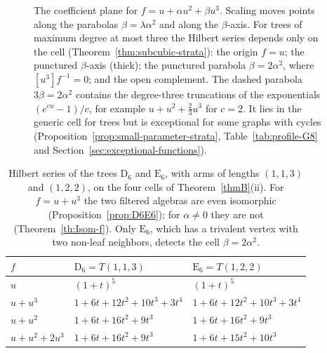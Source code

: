 \documentclass[reqno]{article}
\theoremstyle{plain} %
\theoremstyle{definition}
\theoremstyle{remark}
\numberwithin{equation}{section}
\begin{document}
\begin{figure}[htbp]
\centering
{}
\caption{The coefficient plane for $f=u+\alpha u^2+\beta u^3$. Scaling
moves points along the parabolas $\beta=\lambda\alpha^2$ and along the
$\beta$-axis. For trees of maximum degree at most three the Hilbert series
depends only on the cell (Theorem~\ref{thm:subcubic-strata}): the origin
$f=u$; the punctured $\beta$-axis (thick); the punctured parabola
$\beta=2\alpha^2$, where $[u^3]f^{-1}=0$; and the open complement. The
dashed parabola $3\beta=2\alpha^2$ contains the degree-three truncations
of the exponentials $(e^{cu}-1)/c$, for example $u+u^2+\frac23u^3$ for $c=2$. It
lies in the generic cell for trees but is exceptional for some graphs with
cycles (Proposition~\ref{prop:small-parameter-strata},
Table~\ref{tab:profile-G8} and Section~\ref{sec:exceptional-functions}).}
\label{fig:parameter-plane}
\end{figure}

\begin{table}[htbp]
\centering\renewcommand{\arraystretch}{1.15}
\begin{tabular}{lll}\toprule
$f$ & $\mathrm D_6=T(1,1,3)$ & $\mathrm E_6=T(1,2,2)$\\\midrule
$u$ & $(1+t)^5$ & $(1+t)^5$\\
$u+u^3$ & $1+6t+12t^2+10t^3+3t^4$ & $1+6t+12t^2+10t^3+3t^4$\\
$u+u^2$ & $1+6t+16t^2+9t^3$ & $1+6t+16t^2+9t^3$\\
$u+u^2+2u^3$ & $1+6t+16t^2+9t^3$ & $1+6t+15t^2+10t^3$\\\bottomrule
\end{tabular}
\caption{Hilbert series of the trees $\mathrm D_6$ and $\mathrm E_6$, with arms of
lengths $(1,1,3)$ and $(1,2,2)$, on the four cells of
Theorem~\ref{thmB}(ii). For $f=u+u^3$ the two filtered algebras are
even isomorphic (Proposition~\ref{prop:D6E6}); for $\alpha\ne0$ they are
not (Theorem~\ref{th:Isom-f}). Only $\mathrm E_6$, which has a trivalent vertex
with two non-leaf neighbors, detects the cell $\beta=2\alpha^2$.}
\label{tab:D6E6}
\end{table}
\end{document}
